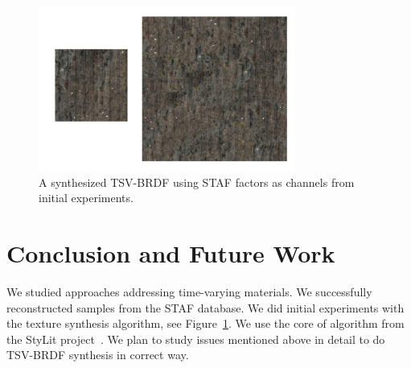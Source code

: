 \documentclass[11pt]{article}
\begin{document}
\begin{figure}[htb] 
\begin{center}
\includegraphics[width=0.75\textwidth]{figures/granite}
\end{center}
\caption{A synthesized TSV-BRDF using STAF factors as channels from initial experiments.}
\label{Fig:Granite}
\end{figure}

\section{Conclusion and Future Work}
We studied approaches addressing time-varying materials. We successfully reconstructed samples from the STAF database. We did initial experiments with the texture synthesis algorithm, see Figure~\ref{Fig:Granite}. We use the core of algorithm from the StyLit project~\cite{Fiser2016}. We plan to study issues mentioned above in detail to do TSV-BRDF synthesis in correct way. 



\end{document}
